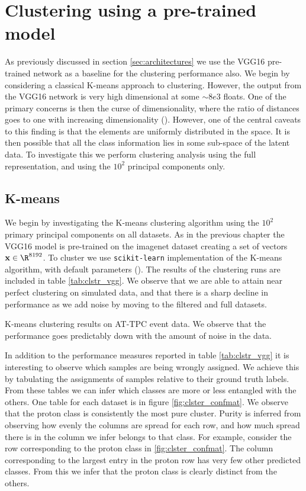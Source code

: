 \section{Clustering using a pre-trained model}\label{sec:vgg_cluster}

As previously discussed in section \ref{sec:architectures} we use the VGG16 pre-trained network as a baseline for the clustering performance also. We begin by considering a classical K-means approach to clustering. However, the output from the VGG16 network is very high dimensional at some $\sim 8e3$ floats. One of the primary concerns is then the curse of dimensionality, where the ratio of distances goes to one with increasing dimensionality (\cite{Aggarwal}). However, one of the central caveats to this finding is that the elements are uniformly distributed in the space. It is then possible that all the class information lies in some sub-space of the latent data. To investigate this we perform clustering analysis using the full representation, and using the $10^2$ principal components only. 

\subsection{K-means}

We begin by investigating the K-means clustering algorithm using the $10^2$ primary principal components on all datasets. As in the previous chapter the VGG16 model is pre-trained on the imagenet dataset creating a set of vectors $\mathbf{x} \in \R^{8192}$. To cluster we use \lstinline{scikit-learn} implementation of the K-means algorithm, with default parameters (\cite{Pedregosa2011}). The results of the clustering runs are included in table \ref{tab:clstr_vgg}. We observe  that we are able to attain near perfect clustering on simulated data, and that there is a sharp decline in performance as we add noise by moving to the filtered and full datasets. 

\begin{table}[H]
\centering 
\caption[K-means on pre-trained model]{K-means clustering results on AT-TPC event data. We observe that the performance goes predictably down with the amount of noise in the data.}\label{tab:clstr_vgg}

\end{table}

In addition to the performance measures reported in table \ref{tab:clstr_vgg} it is interesting to observe which samples are being wrongly assigned. We achieve this by tabulating the assignments of samples relative to their ground truth labels. From these tables we can infer which classes are more or less entangled with the others. One table for each dataset is in figure \ref{fig:clster_confmat}. We observe that the proton class is consistently the most pure cluster. Purity is inferred from observing how evenly the columns are spread for each row, and how much spread there is in the column we infer belongs to that class. For example, consider the row corresponding to the proton class in \ref{fig:clster_confmat}. The column corresponding to the largest entry in the proton row has very few other predicted classes. From this we infer that the proton class is clearly distinct from the others. 

